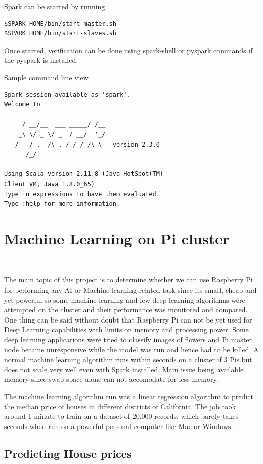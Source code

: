 Spark can be started by running

\begin{verbatim}
$SPARK_HOME/bin/start-master.sh
$SPARK_HOME/bin/start-slaves.sh
\end{verbatim}

Once started, verification can be done using spark-shell or pyspark
commands if the pyspark is installed.

Sample command line view

\begin{verbatim}
Spark session available as 'spark'.
Welcome to
      ____              __
     / __/__  ___ _____/ /__
    _\ \/ _ \/ _ `/ __/  '_/
   /___/ .__/\_,_/_/ /_/\_\   version 2.3.0
      /_/
         
Using Scala version 2.11.8 (Java HotSpot(TM) 
Client VM, Java 1.8.0_65)
Type in expressions to have them evaluated.
Type :help for more information.
\end{verbatim}

\section{Machine Learning on Pi cluster}\

The main topic of this project is to determine whether we can use
Raspberry Pi for performing any AI or Machine learning related task
since its small, cheap and yet powerful so some machine learning and
few deep learning algorithms were attempted on the cluster and their
performance was monitored and compared. One thing can be said without
doubt that Raspberry Pi can not be yet used for Deep Learning
capabilities with limits on memory and processing power. Some deep
learning applications were tried to classify images of flowers and Pi
master node became unresponsive while the model was run and hence had
to be killed. A normal machine learning algorithm runs within seconds
on a cluster if 3 Pis but does not scale very well even with Spark
installed. Main issue being available memory since swap space alone
can not accomodate for less memory.

The machine learning algorithm run was a linear regression algorithm
to predict the median price of houses in different districts of
California. The job took around 1 minute to train on a dataset of
20,000 records, which barely takes seconds when run on a powerful
personal computer like Mac or Windows.

\subsection{Predicting House prices }   

